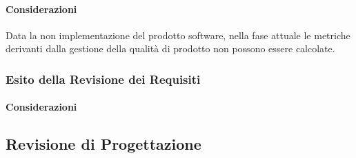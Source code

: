 	\paragraph{Considerazioni}
	Data la non implementazione del prodotto software, nella fase attuale le metriche derivanti dalla gestione della qualità di prodotto non possono essere calcolate.
\subsubsection{Esito della Revisione dei Requisiti}
	
	\paragraph{Considerazioni}
	
\subsection{Revisione di Progettazione}